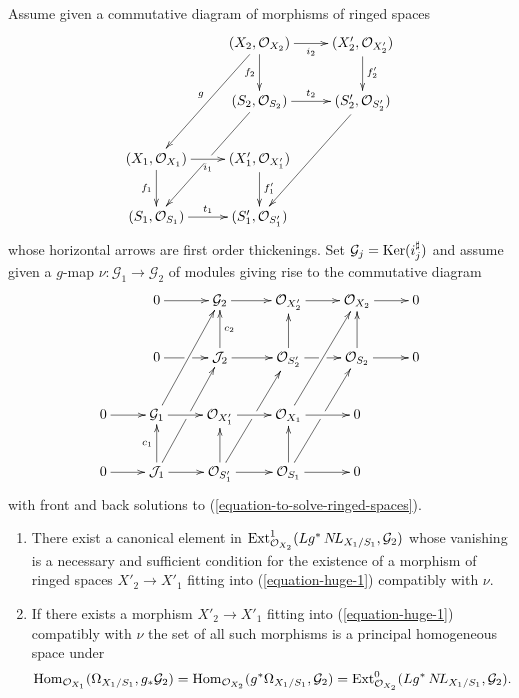 \begin{lemma}
\label{lemma-huge-diagram-ringed-spaces}
Assume given a commutative diagram of morphisms of ringed spaces
\begin{equation}
\label{equation-huge-1}
\vcenter{
\xymatrix{
& (X_2, \mathcal{O}_{X_2}) \ar[r]_{i_2} \ar[d]_{f_2} \ar[ddl]_g &
(X'_2, \mathcal{O}_{X'_2}) \ar[d]^{f'_2} \\
& (S_2, \mathcal{O}_{S_2}) \ar[r]^{t_2} \ar[ddl]|\hole &
(S'_2, \mathcal{O}_{S'_2}) \ar[ddl] \\
(X_1, \mathcal{O}_{X_1}) \ar[r]_{i_1} \ar[d]_{f_1} &
(X'_1, \mathcal{O}_{X'_1}) \ar[d]^{f'_1} \\
(S_1, \mathcal{O}_{S_1}) \ar[r]^{t_1} &
(S'_1, \mathcal{O}_{S'_1})
}
}
\end{equation}
whose horizontal arrows are first order thickenings. Set
$\mathcal{G}_j = \mathop{\mathrm{Ker}}(i_j^\sharp)$ and assume given
a $g$-map $\nu : \mathcal{G}_1 \to \mathcal{G}_2$ of modules
giving rise to the commutative diagram
\begin{equation}
\label{equation-huge-2}
\vcenter{
\xymatrix{
& 0 \ar[r] & \mathcal{G}_2 \ar[r] &
\mathcal{O}_{X'_2} \ar[r] &
\mathcal{O}_{X_2} \ar[r] & 0 \\
& 0 \ar[r]|\hole &
\mathcal{J}_2 \ar[u]_{c_2} \ar[r] &
\mathcal{O}_{S'_2} \ar[u] \ar[r]|\hole &
\mathcal{O}_{S_2} \ar[u] \ar[r] & 0 \\
0 \ar[r] & \mathcal{G}_1 \ar[ruu] \ar[r] &
\mathcal{O}_{X'_1} \ar[r] &
\mathcal{O}_{X_1} \ar[ruu] \ar[r] & 0 \\
0 \ar[r] & \mathcal{J}_1 \ar[ruu]|\hole \ar[u]^{c_1} \ar[r] &
\mathcal{O}_{S'_1} \ar[ruu]|\hole \ar[u] \ar[r] &
\mathcal{O}_{S_1} \ar[ruu]|\hole \ar[u] \ar[r] & 0
}
}
\end{equation}
with front and back solutions to (\ref{equation-to-solve-ringed-spaces}).
\begin{enumerate}
\item There exist a canonical element in
$\mathop{\mathrm{Ext}}\nolimits^1_{\mathcal{O}_{X_2}}(Lg^*\mathop{N\!L}\nolimits_{X_1/S_1}, \mathcal{G}_2)$
whose vanishing is a necessary and sufficient condition for the existence
of a morphism of ringed spaces $X'_2 \to X'_1$ fitting into
(\ref{equation-huge-1}) compatibly with $\nu$.
\item If there exists a morphism $X'_2 \to X'_1$ fitting into
(\ref{equation-huge-1}) compatibly with $\nu$ the set of all such morphisms
is a principal homogeneous space under
$$
\mathop{\mathrm{Hom}}\nolimits_{\mathcal{O}_{X_1}}(\Omega_{X_1/S_1}, g_*\mathcal{G}_2) =
\mathop{\mathrm{Hom}}\nolimits_{\mathcal{O}_{X_2}}(g^*\Omega_{X_1/S_1}, \mathcal{G}_2) =
\mathop{\mathrm{Ext}}\nolimits^0_{\mathcal{O}_{X_2}}(Lg^*\mathop{N\!L}\nolimits_{X_1/S_1}, \mathcal{G}_2).
$$
\end{enumerate}
\end{lemma}

